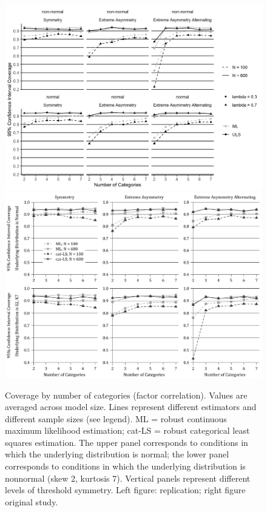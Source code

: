 \documentclass[10,a4paperpaper,]{article}
\begin{document}
\begin{figure}
\includegraphics[width=0.49\linewidth]{./figures/fig_8} \includegraphics[width=0.49\linewidth]{./figures/fig8_original} \caption{Coverage by number of categories (factor correlation). Values are averaged across model size. Lines represent different estimators and different sample sizes (see legend). ML = robust continuous maximum likelihood estimation; cat-LS = robust categorical least squares estimation. The upper panel corresponds to conditions in which the underlying distribution is normal; the lower panel corresponds to conditions in which the underlying distribution is nonnormal (skew 2, kurtosis 7). Vertical panels represent different levels of threshold symmetry. Left figure: replication; right figure original study.}\label{fig:fig8}
\end{figure}
\end{document}
